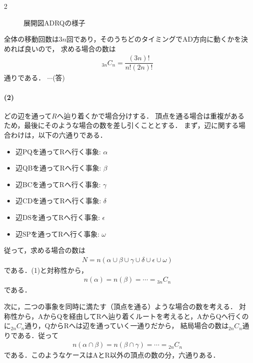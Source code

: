 \documentclass[../../main.tex]{subfiles}
\begin{document}
\begin{multicols}{2}
\begin{figure}[H]
    \caption{展開図ADRQの様子}
    \label{1992-2:fig:2}
  \end{figure}

  全体の移動回数は$3n$回であり，そのうちどのタイミングでAD方向に動くかを決めれば良いので，
  求める場合の数は
  \begin{align}
    {}_{3n}C_n = \dfrac{(3n)!}{n!(2n)!}
  \end{align}
  通りである．  $\cdots$(答)

  \paragraph{(2)}
  どの辺を通って$R$へ辿り着くかで場合分けする．
  頂点を通る場合は重複があるため，最後にそのような場合の数を差し引くこととする．
  まず，辺に関する場合わけは，以下の六通りである．

  \begin{itemize}
    \item 辺PQを通ってRへ行く事象: $\alpha$
    \item 辺QBを通ってRへ行く事象: $\beta$
    \item 辺BCを通ってRへ行く事象: $\gamma$
    \item 辺CDを通ってRへ行く事象: $\delta$
    \item 辺DSを通ってRへ行く事象: $\epsilon$
    \item 辺SPを通ってRへ行く事象: $\omega$
  \end{itemize}
  従って，求める場合の数は
  \begin{align}
    N = n(\alpha \cup \beta \cup \gamma \cup \delta \cup \epsilon \cup \omega) \label{eq:1}
  \end{align}
  である．(1)と対称性から，
  \begin{align}
    n(\alpha) = n(\beta) = \cdots = {}_{3n}C_n \label{eq:2}
  \end{align}
  である．

  次に，二つの事象を同時に満たす（頂点を通る）ような場合の数を考える．
  対称性から，AからQを経由してRへ辿り着くルートを考えると，AからQへ行くのに${}_{2n}C_n$通り，QからRへは辺を通っていく一通りだから，
  結局場合の数は${}_{2n}C_n$通りである．従って
  \begin{align}
    n(\alpha \cap \beta) = n(\beta \cap \gamma) = \cdots = {}_{2n}C_n \label{eq:3}
  \end{align}
  である．このようなケースはAとR以外の頂点の数の分，六通りある．


\end{multicols}
\end{document}
